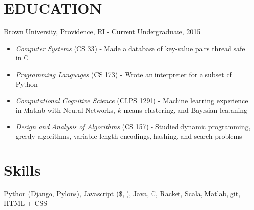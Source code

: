\documentclass[11pt]{res} %
\begin{document}
\begin{resume}

\section{EDUCATION}
Brown University, Providence, RI - Current Undergraduate, 2015
\begin{itemize} \itemsep -2pt
  \item \emph{Computer Systems} (CS 33) - Made a database of key-value pairs thread safe in C
  \item \emph{Programming Languages} (CS 173) - Wrote an interpreter for a subset of Python
  \item \emph{Computational Cognitive Science} (CLPS 1291) - Machine learning experience in Matlab with Neural Networks, $k$-means clustering, and Bayesian learaning
  \item \emph{Design and Analysis of Algorithms} (CS 157) - Studied dynamic programming, greedy algorithms, variable length encodings, hashing,  and search problems
\end{itemize}

 \section{Skills}
  Python (Django, Pylons), Javascript (\$, \underline{\hspace{.25cm}}), Java, C, Racket, Scala, Matlab, git, HTML + CSS


\end{resume}
\end{document}
